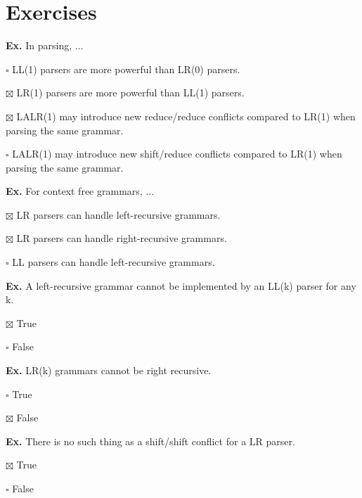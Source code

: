 \section*{Exercises}

\hrulefill

\textbf{Ex.} In parsing, ...
\begin{compactitem}
	\item[$\square$] LL(1) parsers are more powerful than LR(0) parsers.
	\item[$\boxtimes$] LR(1) parsers are more powerful than LL(1) parsers.
	\item[$\boxtimes$] LALR(1) may introduce new reduce/reduce conflicts compared to LR(1) when parsing the same grammar.
	\item[$\square$] LALR(1) may introduce new shift/reduce conflicts compared to LR(1) when parsing the same grammar.
\end{compactitem}

\hrulefill

\textbf{Ex.} For context free grammars, ...
\begin{compactitem}
	\item[$\boxtimes$] LR parsers can handle left-recursive grammars.
	\item[$\boxtimes$] LR parsers can handle right-recursive grammars.
	\item[$\square$] LL parsers can handle left-recursive grammars.
\end{compactitem}

\hrulefill

\textbf{Ex.} A left-recursive grammar cannot be implemented by an LL(k) parser for any k.
\begin{compactitem}
	\item[$\boxtimes$] True
	\item[$\square$] False
\end{compactitem}

\hrulefill

\textbf{Ex.} LR(k) grammars cannot be right recursive.
\begin{compactitem}
	\item[$\square$] True
	\item[$\boxtimes$] False
\end{compactitem}

\hrulefill

\textbf{Ex.} There is no such thing as a shift/shift conflict for a LR parser.
\begin{compactitem}
	\item[$\boxtimes$] True
	\item[$\square$] False
\end{compactitem}

